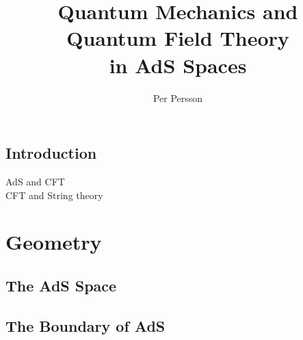 \documentclass[a4paper]{report}
\begin{document}
\title{Quantum Mechanics and\\ Quantum Field Theory \\in AdS Spaces}
\author{Per Persson}
\maketitle
\tableofcontents

\listoffigures
\listoftables
\newpage

\section{Introduction}

AdS and CFT\\
CFT and String theory

\chapter{Geometry}
\section{The AdS Space}







\section{The Boundary of AdS}


\end{document}
